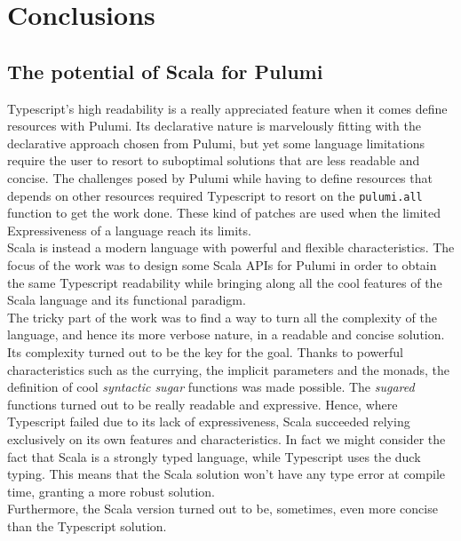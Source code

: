 
\chapter{Conclusions}
\label{cap:conclusions}




\section{The potential of Scala for Pulumi}
Typescript's high readability is a really appreciated feature when it comes define resources with Pulumi.
Its declarative nature is marvelously fitting with the declarative approach chosen from Pulumi, but yet some language limitations require the user to resort to suboptimal solutions that are less readable and concise.
The challenges posed by Pulumi while having to define resources that depends on other resources required Typescript to resort on the \texttt{pulumi.all} function to get the work done.
These kind of patches are used when the limited Expressiveness of a language reach its limits.\\
Scala is instead a modern language with powerful and flexible characteristics.
The focus of the work was to design some Scala APIs for Pulumi in order to obtain the same Typescript readability while bringing along all the cool features of the Scala language and its functional paradigm.\\
The tricky part of the work was to find a way to turn all the complexity of the language, and hence its more verbose nature, in a readable and concise solution.
Its complexity turned out to be the key for the goal.
Thanks to powerful characteristics such as the currying, the implicit parameters and the monads, the definition of cool \textit{syntactic sugar} functions was made possible.
The \textit{sugared} functions turned out to be really readable and expressive.
Hence, where Typescript failed due to its lack of expressiveness, Scala succeeded relying exclusively on its own features and characteristics.
In fact we might consider the fact that Scala is a strongly typed language, while Typescript uses the duck typing.
This means that the Scala solution won't have any type error at compile time, granting a more robust solution.\\
Furthermore, the Scala version turned out to be, sometimes, even more concise than the Typescript solution.\\


